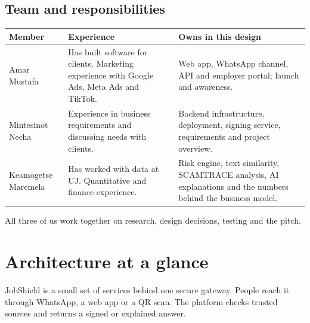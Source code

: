 \documentclass[11pt,a4paper]{article}
\newcommand{\tbl}[1]{\textbf{#1}}
\begin{document}
\subsection{Team and responsibilities}
\begin{center}
\begin{tabularx}{\textwidth}{@{}>{\raggedright\arraybackslash}p{3.1cm}>{\raggedright\arraybackslash}X>{\raggedright\arraybackslash}X@{}}
\toprule
\tbl{Member} & \tbl{Experience} & \tbl{Owns in this design}\\
\midrule
Amar Mustafa & Has built software for clients. Marketing experience with Google Ads, Meta Ads and TikTok. & Web app, WhatsApp channel, API and employer portal; launch and awareness.\\
Mintesinot Necha & Experience in business requirements and discussing needs with clients. & Backend infrastructure, deployment, signing service, requirements and project overview.\\
Keamogetse Maremela & Has worked with data at UJ. Quantitative and finance experience. & Risk engine, text similarity, SCAMTRACE analysis, AI explanations and the numbers behind the business model.\\
\bottomrule
\end{tabularx}
\end{center}
All three of us work together on research, design decisions, testing and the pitch.

\section{Architecture at a glance}
JobShield is a small set of services behind one secure gateway. People reach it through WhatsApp, a web app or a QR scan. The platform checks trusted sources and returns a signed or explained answer.
\end{document}

